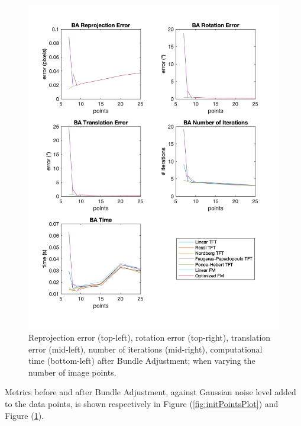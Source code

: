 \begin{figure}[p]
	\centering
	\includegraphics[width=1\textwidth]{Experiments/Synthetic/points/BApointsPlots.png}
	\caption{Reprojection error (top-left), rotation error (top-right), translation error (mid-left), number of iterations (mid-right), computational time (bottom-left) after Bundle Adjustment; when varying the number of image points.}
	\label{fig:BAPointsPlot}
\end{figure}

\pagebreak

Metrics before and after Bundle Adjustment, against Gaussian noise level added to the data points, is shown respectively in Figure (\ref{fig:initPointsPlot}) and Figure (\ref{fig:BAPointsPlot}).

